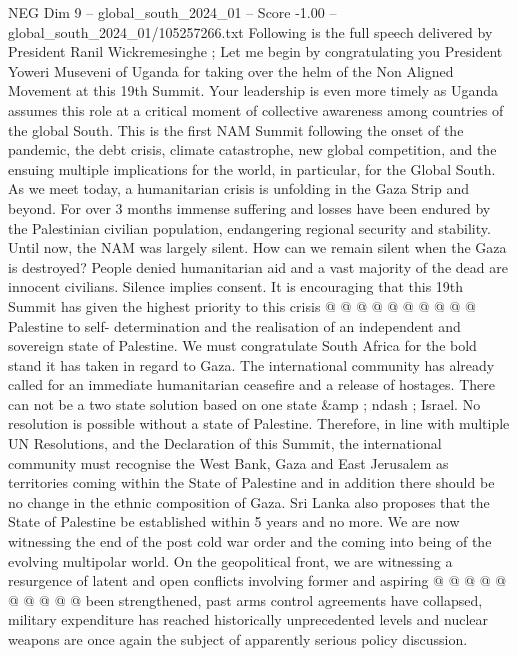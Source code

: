 \begin{textsample}{NEG Dim 9 – global\_south\_2024\_01 – Score -1.00 – global\_south\_2024\_01/105257266.txt}  \label{ex:f9_neg_395}
Following is the full speech delivered by President Ranil Wickremesinghe ; Let me begin by congratulating you President Yoweri Museveni of Uganda for taking over the helm of the Non Aligned Movement at this 19th Summit.
Your leadership is even more timely as Uganda assumes this role at a critical moment of collective awareness among countries of the global South.
This is the first NAM Summit following the onset of the pandemic, the debt crisis, climate catastrophe, new global competition, and the ensuing multiple implications for the world, in particular, for the Global South.
As we meet today, a humanitarian crisis is unfolding in the Gaza Strip and beyond.
For over 3 months immense suffering and losses have been endured by the Palestinian civilian population, endangering regional security and stability.
Until now, the NAM was largely silent.
How can we remain silent when the Gaza is destroyed?
People denied humanitarian aid and a vast majority of the dead are innocent civilians.
Silence implies consent.
It is encouraging that this 19th Summit has given the highest priority to this crisis @ @ @ @ @ @ @ @ @ @ Palestine to self- determination and the realisation of an independent and sovereign state of Palestine.
We must congratulate South Africa for the bold stand it has taken in regard to Gaza.
The international community has already called for an immediate humanitarian ceasefire and a release of hostages.
There can not be a two state solution based on one state \&amp ; ndash ; Israel.
No resolution is possible without a state of Palestine.
Therefore, in line with multiple UN Resolutions, and the Declaration of this Summit, the international community must recognise the West Bank, Gaza and East Jerusalem as territories coming within the State of Palestine and in addition there should be no change in the ethnic composition of Gaza.
Sri Lanka also proposes that the State of Palestine be established within 5 years and no more.
We are now witnessing the end of the post cold war order and the coming into being of the evolving multipolar world.
On the geopolitical front, we are witnessing a resurgence of latent and open conflicts involving former and aspiring @ @ @ @ @ @ @ @ @ @ been strengthened, past arms control agreements have collapsed, military expenditure has reached historically unprecedented levels and nuclear weapons are once again the subject of apparently serious policy discussion.

\end{textsample}
